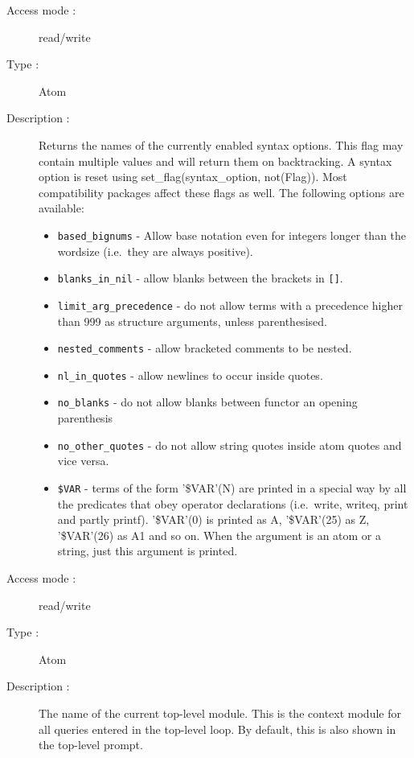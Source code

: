 \begin{description}
\pagebreak[3]
\begin{description}
\item[Access mode : ] read/write
\item[Type : ] Atom
\item[Description : ] Returns the names of the currently enabled syntax options.
This flag may contain multiple values and will return them on backtracking.
A syntax option is reset using set_flag(syntax_option, not(Flag)).
Most compatibility packages affect these flags as well.
The following options are available:
\begin{itemize}
\item {\tt based_bignums} - Allow base notation even for integers
longer than the wordsize (i.e.\ they are always positive).
\item {\tt blanks_in_nil} - allow blanks between the brackets in {\tt []}.
\item {\tt limit_arg_precedence} - do not allow terms with a precedence higher
than 999 as structure arguments, unless parenthesised.
\item {\tt nested_comments} - allow bracketed comments to be nested.
\item {\tt nl_in_quotes} - allow newlines to occur inside quotes.
\item {\tt no_blanks} - do not allow blanks between functor an opening
parenthesis
\item {\tt no_other_quotes} - do not allow string quotes inside atom quotes
and vice versa.
\item {\tt \$VAR} - terms of the form '\$VAR'(N) are printed in a special way by all the predicates that obey operator declarations (i.e.\ write, writeq, print and partly printf). '\$VAR'(0) is printed as A, '\$VAR'(25) as Z, '\$VAR'(26) as A1 and so on.
When the argument is an atom or a string, just this argument is printed.
\end{itemize}
\end{description}

\begin{description}
\item[Access mode : ] read/write
\item[Type : ] Atom
\item[Description : ] The name of the current top-level module. This is the
context module for all queries entered in the top-level loop.
By default, this is also shown in the top-level prompt.
\end{description}


\end{description}
